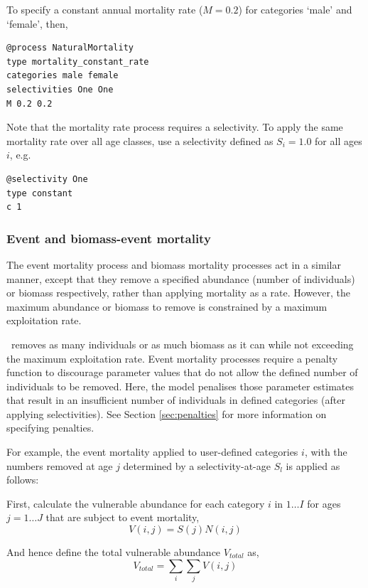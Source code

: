 To specify a constant annual mortality rate ($M=0.2$) for categories `male' and `female', then, 
{\small{\begin{verbatim}
@process NaturalMortality
type mortality_constant_rate
categories male female
selectivities One One
M 0.2 0.2
\end{verbatim}}}
Note that the mortality rate process requires a selectivity. To apply the same mortality rate over all age classes, use a selectivity defined as $S_i=1.0$ for all ages $i$, e.g.
{\small{\begin{verbatim}
@selectivity One
type constant
c 1
\end{verbatim}}}

\subsubsection*{Event and biomass-event mortality}

The event mortality process and biomass mortality processes act in a similar manner, except that they remove a specified abundance (number of individuals) or biomass respectively, rather than applying mortality as a rate. However, the maximum abundance or biomass to remove is constrained by a maximum exploitation rate.

 \CAS\ removes as many individuals or as much biomass as it can while not exceeding the maximum exploitation rate. Event mortality processes require a penalty function to discourage parameter values that do not allow the defined number of individuals to be removed. Here, the model penalises those parameter estimates that result in an insufficient number of individuals in defined categories (after applying selectivities). See Section \ref{sec:penalties} for more information on specifying penalties.

For example, the event mortality applied to user-defined categories $i$, with the numbers removed at age $j$ determined by a selectivity-at-age $S_l$ is applied as follows:

First, calculate the vulnerable abundance for each category $i$ in $1 \ldots I$ for ages $j = 1 \ldots J$ that are subject to event mortality,
\begin{equation}
  V(i,j) = S(j) N(i,j)
\end{equation}

And hence define the total vulnerable abundance $V_{total}$ as,
\begin{equation}
  V_{total}  = \sum\limits_i {\sum\limits_j {V(i,j)}} 
\end{equation}

